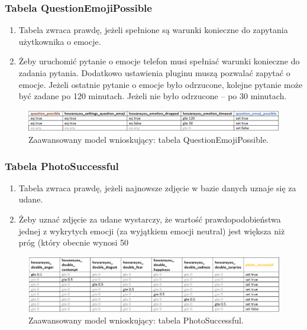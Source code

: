 \subsubsection{Tabela QuestionEmojiPossible}

\begin{enumerate}
\item Tabela zwraca prawdę, jeżeli spełnione są warunki konieczne do zapytania użytkownika o emocje.
\item Żeby uruchomić pytanie o emocje telefon musi spełniać warunki konieczne do zadania pytania. Dodatkowo ustawienia pluginu muszą pozwalać zapytać o emocje. Jeżeli ostatnie pytanie o emocje było odrzucone, kolejne pytanie może być zadane po 120 minutach. Jeżeli nie było odrzucone – po 30 minutach.


\end{enumerate}

\begin{figure}[H]
\centering
\includegraphics[scale=0.8]{rozdzial4/HMR_QuestionEmojiPossible.png}
\caption{Zaawansowany model wnioskujący: tabela QuestionEmojiPossible.}
\end{figure}


\subsubsection{Tabela PhotoSuccessful}

\begin{enumerate}
\item Tabela zwraca prawdę, jeżeli najnowsze zdjęcie w bazie danych uznaje się za udane.
\item Żeby uznać zdjęcie za udane wystarczy, że wartość prawdopodobieństwa jednej z wykrytych emocji (za wyjątkiem emocji neutral) jest większa niż próg (który obecnie wynosi 50%
\end{enumerate}

\begin{figure}[H]
\centering
\includegraphics[scale=0.8]{rozdzial4/HMR_PhotoSuccessful.png}
\caption{Zaawansowany model wnioskujący: tabela PhotoSuccessful.}
\end{figure}


